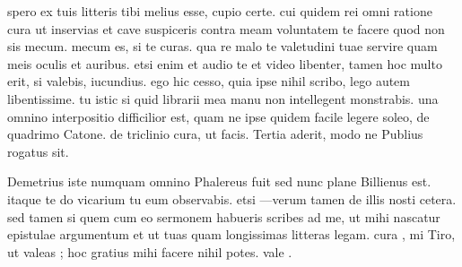 


 spero ex tuis litteris tibi melius esse, cupio certe. cui quidem rei omni ratione cura ut inservias et cave suspiceris contra meam voluntatem te facere quod non sis mecum. mecum es, si te curas. qua re malo te valetudini tuae servire quam meis oculis et auribus. etsi enim et audio te et video libenter, tamen hoc multo erit, si valebis, iucundius. ego hic cesso, quia ipse nihil scribo, lego autem libentissime. tu istic si quid librarii mea manu non intellegent monstrabis. una omnino interpositio difficilior est, quam ne ipse quidem facile legere soleo, de quadrimo Catone. de triclinio cura, ut facis. Tertia aderit, modo ne Publius rogatus sit.

 Demetrius iste numquam omnino Phalereus fuit sed nunc plane Billienus est. itaque te do vicarium tu eum observabis. etsi —verum tamen de illis nosti cetera. sed tamen si quem cum eo sermonem habueris scribes ad me, ut mihi nascatur epistulae argumentum et ut tuas quam longissimas litteras legam. cura , mi Tiro, ut valeas ; hoc gratius mihi facere nihil potes. vale .
